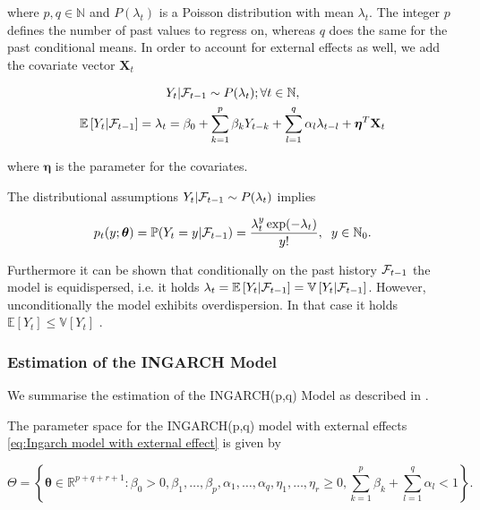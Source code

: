 where $p,q \in \mathbb{N}$ and $P(\lambda_t)$ is a Poisson distribution with mean $\lambda_t$. The integer $p$ defines the number of past values to regress on, whereas $q$ does the same for the past conditional means. In order to account for external effects as well, we add the covariate vector $\textbf{X}_t$

\begin{gather}
\label{eq:Ingarch model with external effect}
Y_t | \mathcal{F}_{t-1} \sim P(\lambda_t); \forall t \in \mathbb{N}, \\
\mathbb{E}\left[Y_t | \mathcal{F}_{t-1} \right] = \lambda_t = \beta_0 + \sum_{k=1}^p\beta_k Y_{t-k} + \sum_{l=1}^q\alpha_l \lambda_{t-l} + \bm{\eta}^T\textbf{X}_t
\end{gather}

where $\bm{\eta}$ is the parameter for the covariates. 

The distributional assumptions $Y_t | \mathcal{F}_{t-1} \sim P(\lambda_t)$ implies 

\begin{equation}
p_t(y;\bm{\theta})=\mathbb{P}(Y_t=y | \mathcal{F}_{t-1}) = \frac{\lambda_t^y \exp(-\lambda_t)}{y!}, \hspace{0.2cm} y \in \mathbb{N}_0.
\label{eq:Ingarch Distribution}
\end{equation}

Furthermore it can be shown that conditionally on the past history $\mathcal{F}_{t-1}$ the model is equidispersed, i.e. it holds $\lambda_t = \mathbb{E}\left[Y_t | \mathcal{F}_{t-1}\right] = \mathbb{V}\left[Y_t | \mathcal{F}_{t-1}\right]$. However, unconditionally the model exhibits overdispersion. In that case it holds $\mathbb{E}\left[Y_t\right] \leq \mathbb{V}\left[Y_t\right] $ \cite{Heinen:2003}. 

\subsubsection{Estimation of the INGARCH Model}
\label{sec: Estimation of the Ingarch Model}

We summarise the estimation of the INGARCH(p,q) Model as described in \cite{Liboschik:2016}.

The parameter space for the INGARCH(p,q) model with external effects \ref{eq:Ingarch model with external effect} is given by 

\begin{equation*}
\Theta = \left\{ \bm{\theta} \in \mathbb{R}^{p+q+r+1}: \beta_0 > 0, \beta_1,\ldots,\beta_p,\alpha_1,\ldots,\alpha_q,\eta_1,\ldots,\eta_r \geq 0, \sum_{k=1}^p\beta_k + \sum_{l=1}^q\alpha_l < 1 \right\}.
\label{eq:Ingarch parameter space}
\end{equation*}

